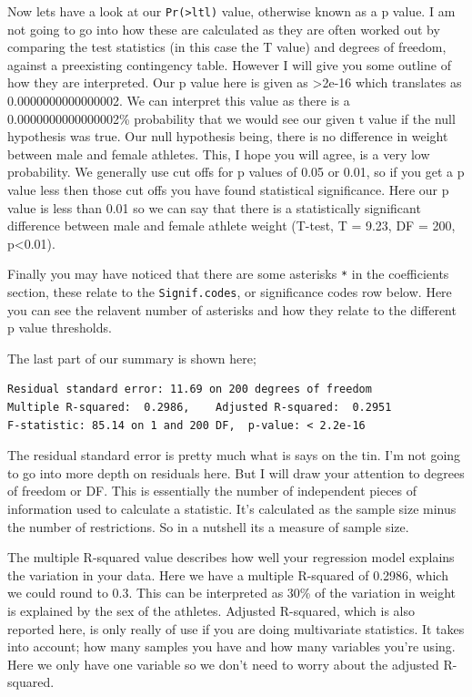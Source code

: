 \documentclass[
]{book}
\begin{document}
Now lets have a look at our \texttt{Pr(\textgreater{}ltl)} value, otherwise known as a p value. I am not going to go into how these are calculated as they are often worked out by comparing the test statistics (in this case the T value) and degrees of freedom, against a preexisting contingency table. However I will give you some outline of how they are interpreted. Our p value here is given as \textgreater2e-16 which translates as 0.0000000000000002. We can interpret this value as there is a 0.0000000000000002\% probability that we would see our given t value if the null hypothesis was true. Our null hypothesis being, there is no difference in weight between male and female athletes. This, I hope you will agree, is a very low probability. We generally use cut offs for p values of 0.05 or 0.01, so if you get a p value less then those cut offs you have found statistical significance. Here our p value is less than 0.01 so we can say that there is a statistically significant difference between male and female athlete weight (T-test, T = 9.23, DF = 200, p\textless0.01).

Finally you may have noticed that there are some asterisks \texttt{*} in the coefficients section, these relate to the \texttt{Signif.codes}, or significance codes row below. Here you can see the relavent number of asterisks and how they relate to the different p value thresholds.

The last part of our summary is shown here;

\begin{verbatim}
Residual standard error: 11.69 on 200 degrees of freedom
Multiple R-squared:  0.2986,    Adjusted R-squared:  0.2951 
F-statistic: 85.14 on 1 and 200 DF,  p-value: < 2.2e-16
\end{verbatim}

The residual standard error is pretty much what is says on the tin. I'm not going to go into more depth on residuals here. But I will draw your attention to degrees of freedom or DF. This is essentially the number of independent pieces of information used to calculate a statistic. It's calculated as the sample size minus the number of restrictions. So in a nutshell its a measure of sample size.

The multiple R-squared value describes how well your regression model explains the variation in your data. Here we have a multiple R-squared of 0.2986, which we could round to 0.3. This can be interpreted as 30\% of the variation in weight is explained by the sex of the athletes. Adjusted R-squared, which is also reported here, is only really of use if you are doing multivariate statistics. It takes into account; how many samples you have and how many variables you're using. Here we only have one variable so we don't need to worry about the adjusted R-squared.
\end{document}
